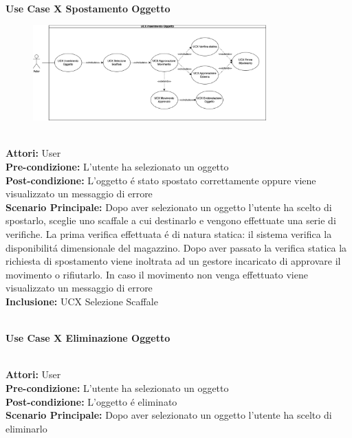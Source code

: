 \vspace{0.5cm}

\Large\textbf{}\\
\Large\textbf{Use Case X Spostamento Oggetto} \\
\begin{figure}[h]
  \centering
  \includegraphics[width=0.8\textwidth]{UseCasesImages/Inserimento.png}
\end{figure}

\vspace{0.5cm}

\large\textbf{} \\
\textbf{Attori:} User\\
\textbf{Pre-condizione:} L'utente ha selezionato un oggetto  \\
\textbf{Post-condizione: } L'oggetto é stato spostato correttamente oppure viene visualizzato un messaggio di errore\\
\textbf{Scenario Principale:}  Dopo aver selezionato un oggetto l'utente ha scelto di spostarlo, sceglie uno scaffale a cui destinarlo e vengono effettuate una serie di verifiche. La prima verifica effettuata é di natura statica: il sistema verifica la disponibilitá dimensionale del magazzino. Dopo aver passato la verifica statica la richiesta di spostamento viene inoltrata ad un gestore incaricato di approvare il movimento o rifiutarlo. In caso il movimento non venga effettuato viene visualizzato un messaggio di errore \\
\textbf{Inclusione:} UCX Selezione Scaffale \\

\vspace{0.5cm}

\Large\textbf{}\\
\Large\textbf{Use Case X Eliminazione Oggetto} \\

\vspace{0.5cm}

\large\textbf{} \\
\textbf{Attori:} User\\
\textbf{Pre-condizione:} L'utente ha selezionato un oggetto  \\
\textbf{Post-condizione: } L'oggetto é eliminato\\
\textbf{Scenario Principale:}  Dopo aver selezionato un oggetto l'utente ha scelto di eliminarlo \\

